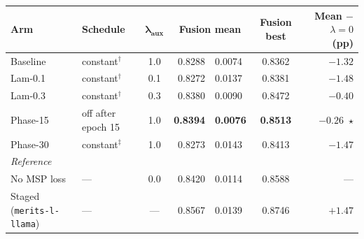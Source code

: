 \documentclass[border=10pt]{standalone}
\begin{document}
\begin{tabular}{llcr@{\;$\pm$\;}lcr}
\toprule
\textbf{Arm} & \textbf{Schedule} & $\boldsymbol{\lambda_{\text{aux}}}$ &
\multicolumn{2}{c}{\textbf{Fusion mean}} & \textbf{Fusion best} &
\textbf{Mean $-$ $\lambda{=}0$ (pp)} \\
\midrule
Baseline  & constant$^{\dagger}$      & 1.0 & 0.8288 & 0.0074 & 0.8362 & $-1.32$ \\
Lam-0.1   & constant$^{\dagger}$      & 0.1 & 0.8272 & 0.0137 & 0.8381 & $-1.48$ \\
Lam-0.3   & constant$^{\dagger}$      & 0.3 & 0.8380 & 0.0090 & 0.8472 & $-0.40$ \\
Phase-15  & off after epoch 15        & 1.0 & \textbf{0.8394} & \textbf{0.0076} & \textbf{0.8513} & $\mathbf{-0.26}$~$\star$ \\
Phase-30  & constant$^{\ddagger}$     & 1.0 & 0.8273 & 0.0143 & 0.8413 & $-1.47$ \\
\midrule
\multicolumn{7}{l}{\textit{Reference}} \\
No MSP loss & ---                     & 0.0 & 0.8420 & 0.0114 & 0.8588 & --- \\
Staged (\texttt{merits-l-llama}) & --- & --- & 0.8567 & 0.0139 & 0.8746 & $+1.47$ \\
\bottomrule
\end{tabular}
\end{document}
